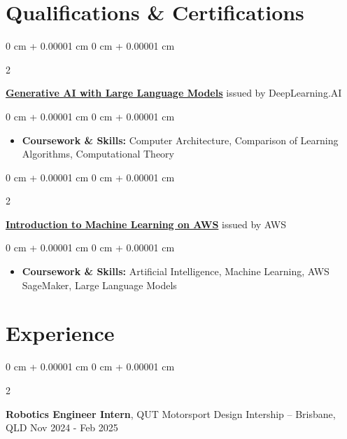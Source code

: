\documentclass[10pt, letterpaper]{article}
\newenvironment{highlights}{
    \begin{itemize}[
        topsep=0.10 cm,
        parsep=0.10 cm,
        partopsep=0pt,
        itemsep=0pt,
        leftmargin=0 cm + 10pt
    ]
}{
    \end{itemize}
} %
\newenvironment{onecolentry}{
    \begin{adjustwidth}{
        0 cm + 0.00001 cm
    }{
        0 cm + 0.00001 cm
    }
}{
    \end{adjustwidth}
} %
\newenvironment{twocolentry}[2][]{
    \onecolentry
    \def\secondColumn{#2}
    \setcolumnwidth{\fill, 4.5 cm}
    \begin{paracol}{2}
}{
    \switchcolumn \raggedleft \secondColumn
    \end{paracol}
    \endonecolentry
} %
\begin{document}
\section{Qualifications \& Certifications}

\begin{twocolentry}{
            issued by DeepLearning.AI
      }
      \textbf{\href{https://www.coursera.org/account/accomplishments/verify/GS66RVWG9TQ8}{Generative AI with Large Language Models}}\end{twocolentry}

\vspace{0.10 cm}
\begin{onecolentry}
      \begin{highlights}

            \item \textbf{Coursework \& Skills:} Computer Architecture, Comparison of Learning Algorithms, Computational Theory

      \end{highlights}
\end{onecolentry}

\vspace{0.2 cm}

\begin{twocolentry}{
            issued by AWS
      }
      \textbf{\href{https://www.coursera.org/account/accomplishments/verify/6ELNTS6QUBYK}{Introduction to Machine Learning on AWS}}\end{twocolentry}

\vspace{0.10 cm}
\begin{onecolentry}
      \begin{highlights}

            \item \textbf{Coursework \& Skills:} Artificial Intelligence, Machine Learning, AWS SageMaker, Large Language Models

      \end{highlights}
\end{onecolentry}

\section{Experience}

\begin{twocolentry}{
            Nov 2024 - Feb 2025
      }
      \textbf{Robotics Engineer Intern}, QUT Motorsport Design Intership -- Brisbane, QLD\end{twocolentry}
\end{document}
